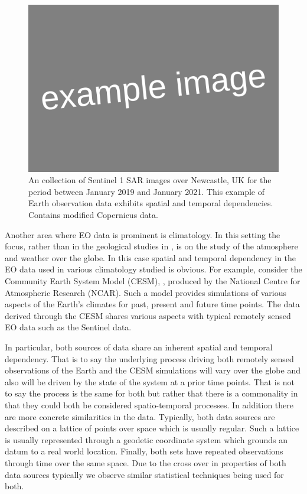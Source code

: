 \begin{figure}[htbp!] 
	\centering    
	\includegraphics[width=1.0\textwidth]{Example_image}
	\caption[Sentinel 1 SAR image time series.]{An collection of Sentinel 1 SAR images over Newcastle, UK for the period between January 2019 and January 2021.   This example of Earth observation data exhibits spatial and temporal dependencies. Contains modified Copernicus data.}
	\label{fig:example_st}
\end{figure}

Another area where EO data is prominent is climatology.
In this setting the focus, rather than in the geological studies in \citep{muro_short-term_2016, khabbazan_crop_2019, raspini_continuous_2018}, is on the study of the atmosphere and weather over the globe.
In this case spatial and temporal dependency in the EO data used in various climatology studied is obvious.
For example, consider the Community Earth System Model (CESM), \citep{kay_community_2015}, produced by the National Centre for Atmospheric Research (NCAR).
Such a model provides simulations of various aspects of the Earth's climates for past, present and future time points.
The data derived through the CESM shares various aspects with typical remotely sensed EO data such as the Sentinel data. 

In particular, both sources of data share an inherent spatial and temporal dependency.
That is to say the underlying process driving both remotely sensed observations of the Earth and the CESM simulations will vary over the globe and also will be driven by the state of the system at a prior time points.
That is not to say the process is the same for both but rather that there is a commonality in that they could both be considered spatio-temporal processes.
In addition there are more concrete similarities in the data.
Typically, both data sources are described on a lattice of points over space which is usually regular.
Such a lattice is usually represented through a geodetic coordinate system which grounds an datum to a real world location.
Finally, both sets have repeated observations through time over the same space.
Due to the cross over in properties of both data sources typically we observe similar statistical techniques being used for both. 

